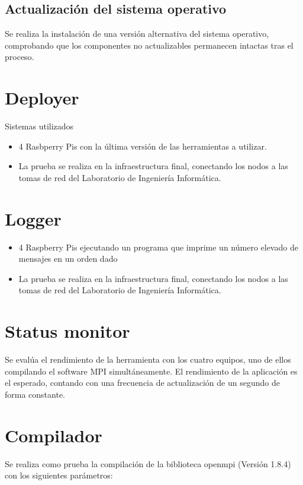 \documentclass{article}
\begin{document}
\subsection*{Actualización del sistema operativo}

Se realiza la instalación de una versión alternativa del sistema operativo, comprobando que los componentes no actualizables permanecen intactas tras el proceso.

\section{Deployer}

Sistemas utilizados
\begin{itemize}
\item 4 Rasbperry Pis con la última versión de las herramientas a utilizar.
\item La prueba se realiza en la infraestructura final, conectando los nodos a las tomas de red del Laboratorio de Ingeniería Informática.
\end{itemize}

\section{Logger}

\begin{itemize}
\item 4 Raspberry Pis ejecutando un programa que imprime un número elevado de mensajes en un orden dado
\item La prueba se realiza en la infraestructura final, conectando los nodos a las tomas de red del Laboratorio de Ingeniería Informática.
\end{itemize}

\section{Status monitor}

Se evalúa el rendimiento de la herramienta con los cuatro equipos, uno de ellos compilando el software MPI simultáneamente. El rendimiento de la aplicación es el esperado, contando con una frecuencia de actualización de un segundo de forma constante.

\section{Compilador}

Se realiza como prueba la compilación de la biblioteca openmpi (Versión 1.8.4) con los siguientes parámetros:
\end{document}
